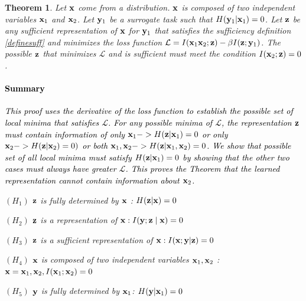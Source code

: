 \documentclass{article} %
\theoremstyle{plain}
\newtheorem{theorem}{Theorem}[section]
\theoremstyle{definition}
\theoremstyle{remark}
\begin{document}
\begin{theorem}

Let ${\mathbf{x}}$ come from a distribution. ${\mathbf{x}}$ is composed of two independent variables ${\mathbf{x}}_1$ and ${\mathbf{x}}_2$. Let ${\mathbf{y}}_1$ be a surrogate task such that $H({\mathbf{y}}_1|{\mathbf{x}}_1) = 0$. Let ${\mathbf{z}}$ be any sufficient representation of ${\mathbf{x}}$ for ${\mathbf{y}}_1$ that satisfies the sufficiency definition \ref{definesuff} and minimizes the loss function $\mathcal{L} = I({\mathbf{x}}_1 {\mathbf{x}}_2; {\mathbf{z}}) - \beta I({\mathbf{z}};{\mathbf{y}}_1)$. The possible ${\mathbf{z}}$ that minimizes $\mathcal{L}$  and is sufficient must meet the condition $I({\mathbf{x}}_2; {\mathbf{z}}) = 0$. 

\textcolor{black}{\paragraph{Summary} This proof uses the derivative of the loss function to establish the possible set of local minima that satisfies $\mathcal{L}$. For any possible minima of $\mathcal{L}$, the representation ${\mathbf{z}}$ must contain information of only  ${\mathbf{x}}_1 ->H({\mathbf{z}}|{\mathbf{x}}_1)=0$ or only ${\mathbf{x}}_2 -> H({\mathbf{z}}| {\mathbf{x}}_2)=0)$ or both ${\mathbf{x}}_1, {\mathbf{x}}_2 -> H({\mathbf{z}}|{\mathbf{x}}_1, {\mathbf{x}}_2)=0$. We show that   possible set of all local minima must satisfy $H({\mathbf{z}}|{\mathbf{x}}_1)=0$ by showing that the other two cases must always have greater $\mathcal{L}$. This proves the Theorem that the learned representation cannot contain information about ${\mathbf{x}}_2$.}


$(H_1)$  ${\mathbf{z}}$ is fully determined by ${\mathbf{x}}$ : $H({\mathbf{z}}|{\mathbf{x}}) = 0$

$(H_2)$  ${\mathbf{z}}$ is a representation of ${\mathbf{x}}: I({\mathbf{y}} ; {\mathbf{z}} \mid {\mathbf{x}})=0$

$(H_3)$  ${\mathbf{z}}$ is a sufficient representation of ${\mathbf{x}}: I({\mathbf{x}} ; {\mathbf{y}} | {\mathbf{z}})=0$

$(H_4)$ ${\mathbf{x}}$ is composed of two independent variables ${\mathbf{x}}_1, {\mathbf{x}}_2$ : ${\mathbf{x}} = {\mathbf{x}}_1, {\mathbf{x}}_2, I({\mathbf{x}}_1; {\mathbf{x}}_2) = 0$

$(H_5)$ ${\mathbf{y}}$ is fully determined by ${\mathbf{x}}_1$: $H({\mathbf{y}}| {\mathbf{x}}_1) = 0$  


\end{theorem}
\end{document}
